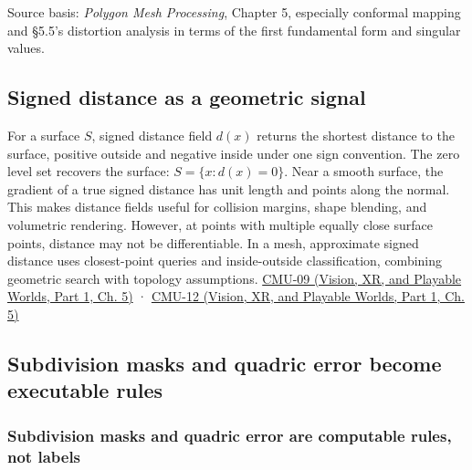 Source basis: \emph{Polygon Mesh Processing}, Chapter 5, especially conformal mapping and §5.5's distortion analysis in terms of the first fundamental form and singular values.

\subsection{Signed distance as a geometric signal}\label{03-visual-computing-i-ch002-signed-distance-as-a-geometric-signal}

\hypertarget{03-visual-computing-i-ch002-signed-distance-as-a-geometric-signal}{}

For a surface \(S\), signed distance field \(d(x)\) returns the shortest distance to the surface, positive outside and negative inside under one sign convention. The zero level set recovers the surface: \(S=\{x:d(x)=0\}\). Near a smooth surface, the gradient of a true signed distance has unit length and points along the normal. This makes distance fields useful for collision margins, shape blending, and volumetric rendering. However, at points with multiple equally close surface points, distance may not be differentiable. In a mesh, approximate signed distance uses closest-point queries and inside-outside classification, combining geometric search with topology assumptions. \href{../07-Vision-XR-and-Playable-Worlds-P01/main.pdf\#nameddest=04-visual-computing-ii-ch036-cmu-09---introduction-to-geometry}{CMU-09 (Vision, XR, and Playable Worlds, Part 1, Ch. 5)} · \href{../07-Vision-XR-and-Playable-Worlds-P01/main.pdf\#nameddest=04-visual-computing-ii-ch036-cmu-12---geometric-queries}{CMU-12 (Vision, XR, and Playable Worlds, Part 1, Ch. 5)}

\subsection{Subdivision masks and quadric error become executable rules}\label{03-visual-computing-i-ch002-subdivision-masks-and-quadric-error-become-executable-rules}

\hypertarget{03-visual-computing-i-ch002-subdivision-masks-and-quadric-error-become-executable-rules}{}

\subsubsection{Subdivision masks and quadric error are computable rules, not labels}\label{03-visual-computing-i-ch002-subdivision-masks-and-quadric-error-are-computable-rules-not-labels}

